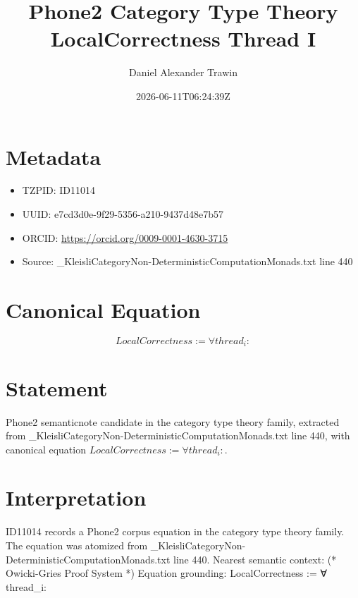 \documentclass[11pt]{article}
\title{Phone2 Category Type Theory LocalCorrectness Thread I}
\author{Daniel Alexander Trawin}
\date{2026-06-11T06:24:39Z}
\begin{document}
\maketitle
\section*{Metadata}
\begin{itemize}
\item TZPID: ID11014
\item UUID: e7cd3d0e-9f29-5356-a210-9437d48e7b57
\item ORCID: \url{https://orcid.org/0009-0001-4630-3715}
\item Source: _KleisliCategoryNon-DeterministicComputationMonads.txt line 440
\end{itemize}
\section*{Canonical Equation}
\[
LocalCorrectness := ∀ thread_i:
\]
\section*{Statement}
Phone2 semanticnote candidate in the category type theory family, extracted from _KleisliCategoryNon-DeterministicComputationMonads.txt line 440, with canonical equation $LocalCorrectness := ∀ thread_i:$.
\section*{Interpretation}
ID11014 records a Phone2 corpus equation in the category type theory family. The equation was atomized from _KleisliCategoryNon-DeterministicComputationMonads.txt line 440. Nearest semantic context: (* Owicki-Gries Proof System *) Equation grounding: LocalCorrectness := ∀ thread_i:
\end{document}
